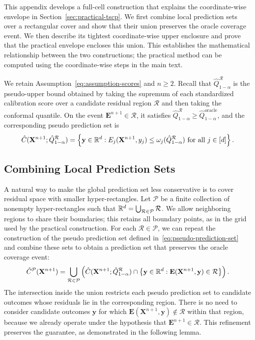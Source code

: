 {\color{blue}
This appendix develops a full-cell construction that explains the coordinate-wise envelope in Section~\ref{sec:practical-tscp}. We first combine local prediction sets over a rectangular cover and show that their union preserves the oracle coverage event. We then describe its tightest coordinate-wise upper enclosure and prove that the practical envelope encloses this union. This establishes the mathematical relationship between the two constructions; the practical method can be computed using the coordinate-wise steps in the main text.

We retain Assumption~\ref{eq:assumption-scores} and $n\geq2$. Recall that $\hat Q^{\mathcal R}_{1-\alpha}$ is the pseudo-upper bound obtained by taking the supremum of each standardized calibration score over a candidate residual region $\mathcal R$ and then taking the conformal quantile. On the event $\mathbf E^{n+1}\in\mathcal R$, it satisfies $\hat Q^{\mathcal R}_{1-\alpha}\geq\hat Q^{\mathrm{oracle}}_{1-\alpha}$, and the corresponding pseudo prediction set is
\[
\hat C(\mathbf X^{n+1};\hat Q^{\mathcal R}_{1-\alpha})
=\left\{\mathbf y\in\mathbb{R}^d:
E_j(\mathbf X^{n+1},y_j)\leq\omega_j(\hat Q^{\mathcal R}_{1-\alpha})
\text{ for all }j\in[d]\right\}.
\]

\subsection{Combining Local Prediction Sets}\label{app:local-union}

A natural way to make the global prediction set less conservative is to cover residual space with smaller hyper-rectangles. Let $\mathcal P$ be a finite collection of nonempty hyper-rectangles such that $\mathbb{R}^d=\bigcup_{\mathcal R\in\mathcal P}\mathcal R$. We allow neighboring regions to share their boundaries; this retains all boundary points, as in the grid used by the practical construction. For each $\mathcal R\in\mathcal P$, we can repeat the construction of the pseudo prediction set defined in~\eqref{eq:pseudo-prediction-set} and combine these sets to obtain a prediction set that preserves the oracle coverage event:
\begin{equation}\label{eq:local-prediction-set}
\hat C^{\mathcal P}(\mathbf X^{n+1})
=\bigcup_{\mathcal R\in\mathcal P}
\left(
\hat C(\mathbf X^{n+1};\hat Q^{\mathcal R}_{1-\alpha})
\cap
\left\{\mathbf y\in\mathbb{R}^d:
\mathbf E(\mathbf X^{n+1},\mathbf y)\in\mathcal R\right\}
\right).
\end{equation}
The intersection inside the union restricts each pseudo prediction set to candidate outcomes whose residuals lie in the corresponding region. There is no need to consider candidate outcomes $\mathbf y$ for which $\mathbf E(\mathbf X^{n+1},\mathbf y)\notin\mathcal R$ within that region, because we already operate under the hypothesis that $\mathbf E^{n+1}\in\mathcal R$. This refinement preserves the guarantee, as demonstrated in the following lemma.

}
